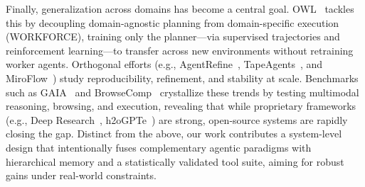 Finally, generalization across domains has become a central goal. OWL~\cite{owl2025} tackles this by decoupling domain-agnostic planning from domain-specific execution (WORKFORCE), training only the planner—via supervised trajectories and reinforcement learning—to transfer across new environments without retraining worker agents. Orthogonal efforts (e.g., AgentRefine~\cite{fu2025agentrefine}, TapeAgents~\cite{bahdanau2024tapeagentsholisticframeworkagent}, and MiroFlow~\cite{miroflow}) study reproducibility, refinement, and stability at scale. Benchmarks such as GAIA~\cite{mialon2023gaia} and BrowseComp~\cite{wei2025browsecomp} crystallize these trends by testing multimodal reasoning, browsing, and execution, revealing that while proprietary frameworks (e.g., Deep Research~\cite{deepresearch}, h2oGPTe~\cite{h2oGPTe2024h2oGPTe}) are strong, open-source systems are rapidly closing the gap. Distinct from the above, our work contributes a system-level design that intentionally fuses complementary agentic paradigms with hierarchical memory and a statistically validated tool suite, aiming for robust gains under real-world constraints.
